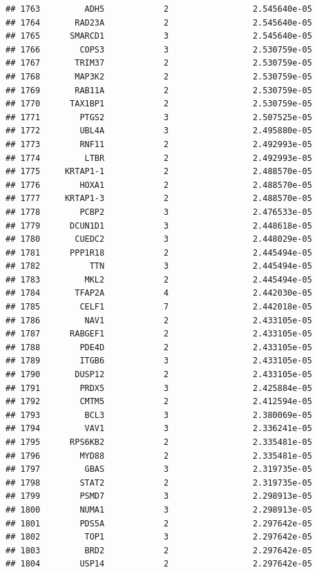 \documentclass[
]{article}
\begin{document}
\begin{verbatim}
## 1763         ADH5            2                 2.545640e-05
## 1764       RAD23A            2                 2.545640e-05
## 1765      SMARCD1            3                 2.545640e-05
## 1766        COPS3            3                 2.530759e-05
## 1767       TRIM37            2                 2.530759e-05
## 1768       MAP3K2            2                 2.530759e-05
## 1769       RAB11A            2                 2.530759e-05
## 1770      TAX1BP1            2                 2.530759e-05
## 1771        PTGS2            3                 2.507525e-05
## 1772        UBL4A            3                 2.495880e-05
## 1773        RNF11            2                 2.492993e-05
## 1774         LTBR            2                 2.492993e-05
## 1775     KRTAP1-1            2                 2.488570e-05
## 1776        HOXA1            2                 2.488570e-05
## 1777     KRTAP1-3            2                 2.488570e-05
## 1778        PCBP2            3                 2.476533e-05
## 1779      DCUN1D1            3                 2.448618e-05
## 1780       CUEDC2            3                 2.448029e-05
## 1781      PPP1R18            2                 2.445494e-05
## 1782          TTN            3                 2.445494e-05
## 1783         MKL2            2                 2.445494e-05
## 1784       TFAP2A            4                 2.442030e-05
## 1785        CELF1            7                 2.442018e-05
## 1786         NAV1            2                 2.433105e-05
## 1787      RABGEF1            2                 2.433105e-05
## 1788        PDE4D            2                 2.433105e-05
## 1789        ITGB6            3                 2.433105e-05
## 1790       DUSP12            2                 2.433105e-05
## 1791        PRDX5            3                 2.425884e-05
## 1792        CMTM5            2                 2.412594e-05
## 1793         BCL3            3                 2.380069e-05
## 1794         VAV1            3                 2.336241e-05
## 1795      RPS6KB2            2                 2.335481e-05
## 1796        MYD88            2                 2.335481e-05
## 1797         GBAS            3                 2.319735e-05
## 1798        STAT2            2                 2.319735e-05
## 1799        PSMD7            3                 2.298913e-05
## 1800        NUMA1            3                 2.298913e-05
## 1801        PDS5A            2                 2.297642e-05
## 1802         TOP1            3                 2.297642e-05
## 1803         BRD2            2                 2.297642e-05
## 1804        USP14            2                 2.297642e-05

\end{verbatim}
\end{document}
